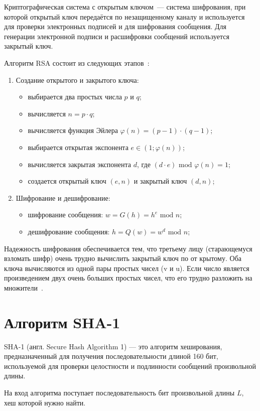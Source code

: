 Криптографическая система с открытым ключом~--- система шифрования, при которой открытый ключ передаётся по незащищенному каналу и используется для проверки электронных подписей и для шифрования сообщения.
Для генерации электронной подписи и расшифровки сообщений используется закрытый ключ.

Алгоритм RSA состоит из следующих этапов~\cite{rsa}:
\begin{enumerate}
	\item Создание открытого и закрытого ключа:
	\begin{itemize}
		\item выбирается два простых числа $p$ и $q$;
		\item вычисляется $n = p \cdot q$;
		\item вычисляется функция Эйлера $\varphi(n) = (p - 1) \cdot (q - 1)$;
		\item выбирается открытая экспонента $e \in (1; \varphi(n))$;
		\item вычисляется закрытая экспонента $d$, где $(d \cdot e) \text{ mod } \varphi(n) = 1$;
		\item создается открытый ключ $(e, n)$ и закрытый ключ $(d, n)$;
	\end{itemize}
	\item Шифрование и дешифрование:
	\begin{itemize}
		\item шифрование сообщения: $w = G(h) = h^e \text{ mod } n$;
		\item дешифрование сообщения: $h = Q(w) = w^d \text{ mod } n$;
	\end{itemize}
\end{enumerate}

Надежность шифрования обеспечивается тем, что третьему лицу (старающемуся взломать шифр) очень трудно вычислить закрытый ключ по от крытому.
Оба ключа вычисляются из одной пары простых чисел (v и u).
Если число является произведением двух очень больших простых чисел, что его трудно разложить на множители~\cite{rsa}.

\section{Алгоритм SHA-1}

SHA-1 (англ. Secure Hash Algorithm 1) — это алгоритм хеширования, предназначенный для получения последовательности длиной 160 бит, используемой для проверки целостности и подлинности сообщений произвольной длины.

На вход алгоритма поступает последовательность бит произвольной длины $ L $, хеш которой нужно найти.

